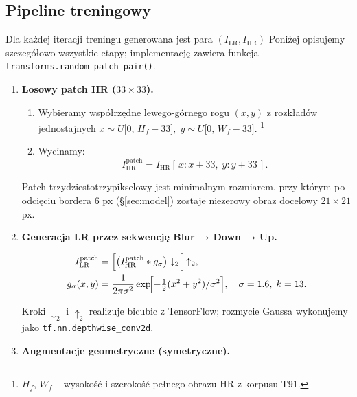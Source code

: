 \documentclass[11pt]{article}
\begin{document}
\subsection{Pipeline treningowy}
\label{sec:data_pipeline}

Dla każdej iteracji treningu generowana jest para
\((I_\mathrm{LR}, I_\mathrm{HR})\)
Poniżej opisujemy szczegółowo wszystkie
etapy; implementację zawiera funkcja
\texttt{transforms.random\_patch\_pair()}.

\begin{enumerate}
\item \textbf{Losowy patch HR (\(33\times33\)).}

\begin{enumerate}
\item Wybieramy współrzędne lewego-górnego rogu
      \((x,y)\) z rozkładów jednostajnych  
      \(x\sim U\bigl[0,\,H_f-33\bigr],\;
        y\sim U\bigl[0,\,W_f-33\bigr]\).%
      \footnote{$H_f,\,W_f$ – wysokość i szerokość pełnego obrazu HR
      z korpusu T91.}
\item Wycinamy:
\[
  I_\mathrm{HR}^{\mathrm{patch}} = 
  I_\mathrm{HR}[\,x:x+33,\; y:y+33\,].
\]
\end{enumerate}

Patch trzydziestotrzy­pikselowy jest minimalnym rozmiarem, przy którym
po odcięciu bordera \(6\) px (\S\ref{sec:model}) zostaje niezerowy obraz
docelowy \(21\times21\) px.

\item \textbf{Generacja LR przez sekwencję Blur → Down → Up.}

\begin{align}
  I_\mathrm{LR}^{\mathrm{patch}}
  &= \Bigl[\bigl(I_\mathrm{HR}^{\mathrm{patch}} * g_{\sigma}\bigr)
      \downarrow_{2}\,\Bigr]\!\uparrow_{2},
  \\
  g_{\sigma}(x,y) &= \frac{1}{2\pi\sigma^{2}}
      \exp\!\Bigl[-\tfrac12(x^{2}+y^{2})/\sigma^{2}\Bigr],
      \quad
      \sigma = 1.6,\; k = 13.
\end{align}

Kroki \(\downarrow_{2}\) i \(\uparrow_{2}\) realizuje bicubic
z TensorFlow; rozmycie Gaussa wykonujemy jako
\texttt{tf.nn.depthwise\_conv2d}.

\item \textbf{Augmentacje geometryczne (symetryczne).}


\end{enumerate}
\end{document}

